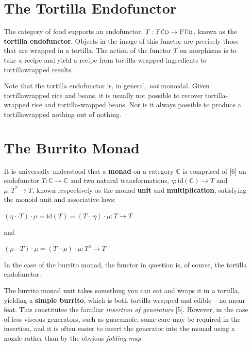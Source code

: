 \documentclass[10pt,twoside,openleft]{memoir}
\begin{document}
\section{The Tortilla Endofunctor}

The category of food supports an endofunctor, $T : \textrm{\textsc{F\"ud}} \rightarrow \textrm{\textsc{F\"ud}}$, known as the
\textbf{tortilla endofunctor}. Objects in the image of this functor are precisely those
that are wrapped in a tortilla. The action of the functor $T$ on morphisms is
to take a recipe and yield a recipe from tortilla-wrapped ingredients to tortillawrapped results.

Note that the tortilla endofunctor is, in general, \textit{not} monoidal. Given tortillawrapped rice and beans, it is usually not possible to recover tortilla-wrapped
rice and tortilla-wrapped beans. Nor is it always possible to produce a tortillawrapped nothing out of nothing.

\section{The Burrito Monad}

It is universally understood that a \textbf{monad} on a category $\mathbb{C}$ is comprised of [6] an endofunctor $T : \mathbb{C} \rightarrow \mathbb{C}$ and two natural transformations, $\eta : \textrm{id}(\mathbb{C}) \rightarrow T$
and $\mu : T^2 \rightarrow T$, known respectively as the monad \textbf{unit} and \textbf{multiplication},
satisfying the monoid unit and associative laws:

\begin{center}
$(\eta \cdot \cdot T) \cdot \mu = \textrm{id}(T) = (T \cdot \cdot \eta) \cdot \mu : T \rightarrow T$
\end{center}

\noindent and

\begin{center}
$(\mu \cdot \cdot T) \cdot \mu = (T \cdot \cdot \mu) \cdot \mu : T^3 \rightarrow T$
\end{center}

In the case of the burrito monad, the functor in question is, of course, the tortilla
endofunctor.

The burrito monad unit takes something you can eat and wraps it in a
tortilla, yielding a \textbf{simple burrito}, which is both tortilla-wrapped and edible --
no mean feat. This constitutes the familiar \textit{insertion of generators} [5]. However,
in the case of less-viscous generators, such as guacamole, some care may be
required in the insertion, and it is often easier to insert the generator into the
monad using a nozzle rather than by the obvious \textit{folding map}.
\end{document}
